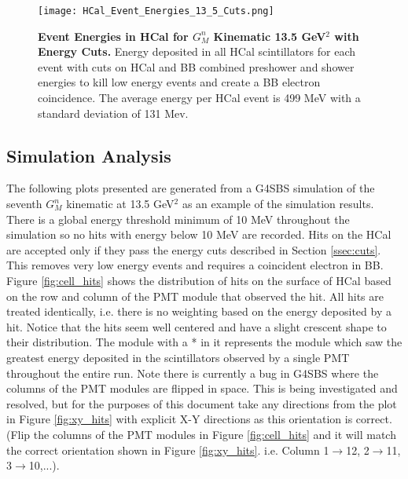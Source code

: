 \documentclass[10pt]{article}
\begin{document}
	\begin{figure}[!ht]
	\begin{center}
	\texttt{[image: HCal\_Event\_Energies\_13\_5\_Cuts.png]}
	\end{center}
	\caption{
	{\bf{Event Energies in HCal for $G_M^n$ Kinematic 13.5 GeV$^2$ with Energy Cuts.}} Energy deposited in all HCal scintillators for each event with cuts on HCal and BB combined preshower and shower energies to kill low energy events and create a BB electron coincidence. The average energy per HCal event is 499 MeV with a standard deviation of 131 Mev.}
	\label{fig:hcal_evt_eng_cuts}
	\end{figure}

\subsection{Simulation Analysis}

	The following plots presented are generated from a G4SBS simulation of the seventh $G_M^n$ kinematic at 13.5 GeV$^2$ as an example of the simulation results. There is a global energy threshold minimum of 10 MeV throughout the simulation so no hits with energy below 10 MeV are recorded. Hits on the HCal are accepted only if they pass the energy cuts described in Section \ref{ssec:cuts}. This removes very low energy events and requires a coincident electron in BB.\\
	
	Figure \ref{fig:cell_hits} shows the distribution of hits on the surface of HCal based on the row and column of the PMT module that observed the hit. All hits are treated identically, i.e. there is no weighting based on the energy deposited by a hit. Notice that the hits seem well centered and have a slight crescent shape to their distribution. The module with a * in it represents the module which saw the greatest energy deposited in the scintillators observed by a single PMT throughout the entire run. Note there is currently a bug in G4SBS where the columns of the PMT modules are flipped in space. This is being investigated and resolved, but for the purposes of this document take any directions from the plot in Figure \ref{fig:xy_hits} with explicit X-Y directions as this orientation is correct. (Flip the columns of the PMT modules in Figure \ref{fig:cell_hits} and it will match the correct orientation shown in Figure \ref{fig:xy_hits}. i.e. Column 1$\rightarrow$12, 2$\rightarrow$11, 3$\rightarrow$10,...).\\
	
\end{document}
